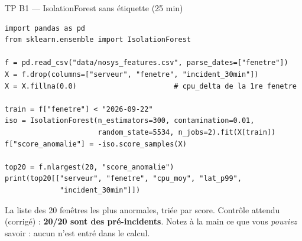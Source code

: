 \begin{frame}[fragile]{TP B1 --- IsolationForest sans étiquette (25 min)}
\begin{codebox}
\begin{lstlisting}
import pandas as pd
from sklearn.ensemble import IsolationForest

f = pd.read_csv("data/nosys_features.csv", parse_dates=["fenetre"])
X = f.drop(columns=["serveur", "fenetre", "incident_30min"])
X = X.fillna(0.0)                       # cpu_delta de la 1re fenetre

train = f["fenetre"] < "2026-09-22"
iso = IsolationForest(n_estimators=300, contamination=0.01,
                      random_state=5534, n_jobs=2).fit(X[train])
f["score_anomalie"] = -iso.score_samples(X)

top20 = f.nlargest(20, "score_anomalie")
print(top20[["serveur", "fenetre", "cpu_moy", "lat_p99",
             "incident_30min"]])
\end{lstlisting}
\end{codebox}
\begin{abox}[Livrable B1]
La liste des 20 fenêtres les plus anormales, triée par score.
Contrôle attendu (corrigé) : \textbf{20/20 sont des pré-incidents}.
Notez à la main ce que vous \emph{pouviez} savoir : aucun
 n'est entré dans le calcul.
\end{abox}
\end{frame}

